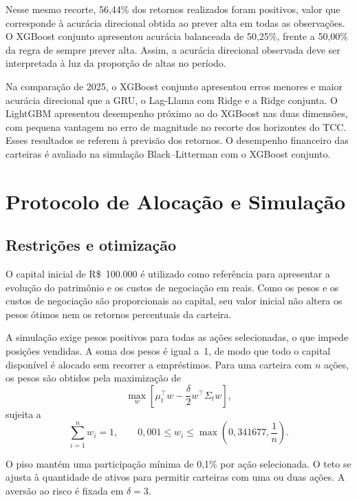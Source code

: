 Nesse mesmo recorte, 56,44\% dos retornos realizados foram positivos, valor que corresponde à acurácia direcional obtida ao prever alta em todas as observações. O XGBoost conjunto apresentou acurácia balanceada de 50,25\%, frente a 50,00\% da regra de sempre prever alta. Assim, a acurácia direcional observada deve ser interpretada à luz da proporção de altas no período.

Na comparação de 2025, o XGBoost conjunto apresentou erros menores e maior acurácia direcional que a GRU, o Lag-Llama com Ridge e a Ridge conjunta. O LightGBM apresentou desempenho próximo ao do XGBoost nas duas dimensões, com pequena vantagem no erro de magnitude no recorte dos horizontes do TCC. Esses resultados se referem à previsão dos retornos. O desempenho financeiro das carteiras é avaliado na simulação Black--Litterman com o XGBoost conjunto.

\section{Protocolo de Alocação e Simulação}
\label{sec:protocolo_experimental}

\subsection{Restrições e otimização}

O capital inicial de R\$~100.000 é utilizado como
referência para apresentar a evolução do patrimônio e
os custos de negociação em reais. Como os pesos e os
custos de negociação são proporcionais ao capital, seu
valor inicial não altera os pesos ótimos nem os
retornos percentuais da carteira.

A simulação exige pesos positivos para todas as ações
selecionadas, o que impede posições vendidas. A soma
dos pesos é igual a~1, de modo que todo o capital
disponível é alocado sem recorrer a empréstimos.
Para uma carteira com $n$ ações, os pesos são obtidos
pela maximização de
\begin{equation}
\max_w
\left[
\mu_t^\top w
-
\frac{\delta}{2}
w^\top\Sigma_t w
\right],
\label{eq:otimizacao_experimental}
\end{equation}
sujeita a
\begin{equation}
\sum_{i=1}^{n}w_i=1,
\qquad
0,001\leq w_i\leq
\max\left(0,341677,\frac{1}{n}\right).
\label{eq:restricoes_experimentais}
\end{equation}

O piso mantém uma participação mínima de 0,1\% por
ação selecionada. O teto se ajusta à quantidade de
ativos para permitir carteiras com uma ou duas ações.
A aversão ao risco é fixada em $\delta=3$.

